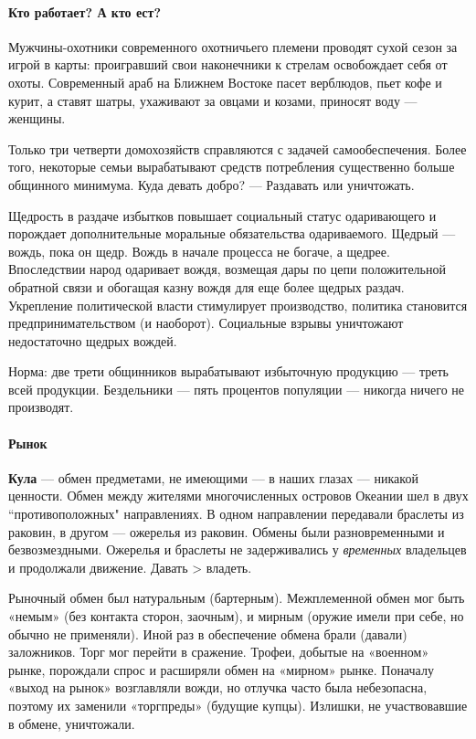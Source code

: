 \paragraph[Кто работает? А кто ест?]{Кто работает? А кто ест?}

Мужчины-охотники современного охотничьего племени проводят сухой сезон за игрой в карты: проигравший свои наконечники к
стрелам освобождает себя от охоты. Современный араб на Ближнем Востоке пасет верблюдов, пьет кофе и курит, а ставят
шатры, ухаживают за овцами и козами, приносят воду — женщины.

Только три четверти домохозяйств справляются с задачей самообеспечения. Более того, некоторые семьи вырабатывают средств
потребления существенно больше общинного минимума. Куда девать добро? — Раздавать или уничтожать.

Щедрость в раздаче избытков повышает социальный статус одаривающего и порождает дополнительные моральные обязательства
одариваемого. Щедрый — вождь, пока он щедр. Вождь в начале процесса не богаче, а щедрее. Впоследствии народ одаривает
вождя, возмещая дары по цепи положительной обратной связи и обогащая казну вождя для еще более щедрых раздач.
Укрепление политической власти стимулирует производство, политика становится предпринимательством (и наоборот).
Социальные взрывы уничтожают недостаточно щедрых вождей.

Норма: две трети общинников вырабатывают избыточную продукцию — треть всей продукции. Бездельники — пять процентов
популяции — никогда ничего не производят.

\paragraph[Рынок]{Рынок}
\textbf{Кула }— обмен предметами, не имеющими — в наших глазах — никакой ценности. Обмен между жителями многочисленных
островов Океании шел в двух ``противоположных" направлениях. В одном направлении передавали
браслеты из раковин, в другом — ожерелья из раковин. Обмены были разновременными и безвозмездными. Ожерелья и браслеты
не задерживались у \textit{временных} владельцев и продолжали движение. Давать
\foreignlanguage{english}{{\textgreater}} владеть.

Рыночный обмен был натуральным (бартерным). Межплеменной обмен мог быть «немым» (без контакта сторон, заочным), и мирным
(оружие имели при себе, но обычно не применяли). Иной раз в обеспечение обмена брали (давали) заложников. Торг мог
перейти в сражение. Трофеи, добытые на «военном» рынке, порождали спрос и расширяли обмен на «мирном» рынке. Поначалу
«выход на рынок» возглавляли вожди, но отлучка часто была небезопасна, поэтому их заменили «торгпреды» (будущие купцы).
Излишки, не участвовавшие в обмене, уничтожали.

